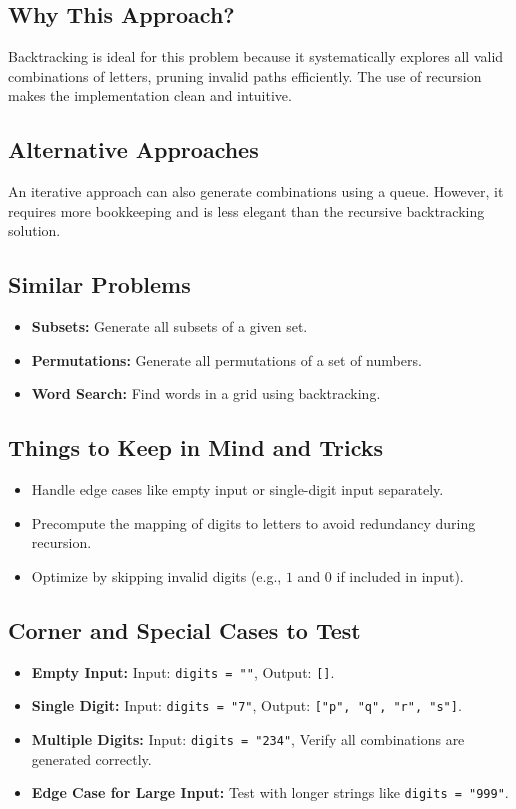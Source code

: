 \subsection*{Why This Approach?}
Backtracking is ideal for this problem because it systematically explores all valid combinations of letters, pruning invalid paths efficiently. The use of recursion makes the implementation clean and intuitive.

\subsection*{Alternative Approaches}
An iterative approach can also generate combinations using a queue. However, it requires more bookkeeping and is less elegant than the recursive backtracking solution.

\subsection*{Similar Problems}
\begin{itemize}
    \item \textbf{Subsets:} Generate all subsets of a given set.
    \item \textbf{Permutations:} Generate all permutations of a set of numbers.
    \item \textbf{Word Search:} Find words in a grid using backtracking.
\end{itemize}

\subsection*{Things to Keep in Mind and Tricks}
\begin{itemize}
    \item Handle edge cases like empty input or single-digit input separately.
    \item Precompute the mapping of digits to letters to avoid redundancy during recursion.
    \item Optimize by skipping invalid digits (e.g., \(1\) and \(0\) if included in input).
\end{itemize}

\subsection*{Corner and Special Cases to Test}
\begin{itemize}
    \item \textbf{Empty Input:} Input: \texttt{digits = ""}, Output: \texttt{[]}.
    \item \textbf{Single Digit:} Input: \texttt{digits = "7"}, Output: \texttt{["p", "q", "r", "s"]}.
    \item \textbf{Multiple Digits:} Input: \texttt{digits = "234"}, Verify all combinations are generated correctly.
    \item \textbf{Edge Case for Large Input:} Test with longer strings like \texttt{digits = "999"}.
\end{itemize}

